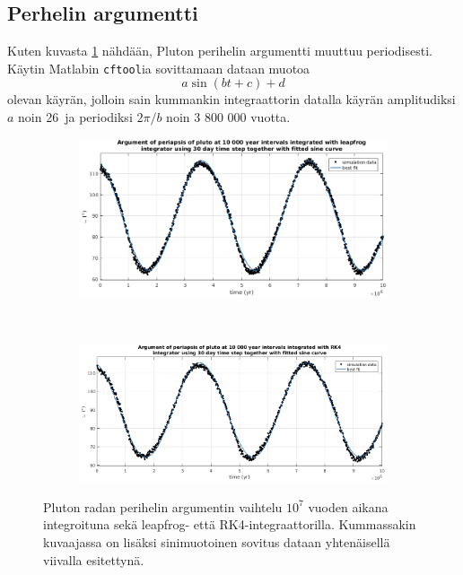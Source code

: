 \documentclass[12pt,a4paper,titlepage]{article}
\begin{document}
\subsection{Perhelin argumentti}
Kuten kuvasta \ref{longrun-omegas} nähdään, Pluton perihelin argumentti muuttuu periodisesti. Käytin Matlabin \texttt{cftool}ia sovittamaan dataan muotoa
$$a\sin{(bt+c)}+d$$
olevan käyrän, jolloin sain kummankin integraattorin datalla käyrän amplitudiksi $a$  noin 26\textdegree\ ja periodiksi $2\pi/b$ noin 3 800 000 vuotta.

\begin{figure}[h!]
    \centering
    \begin{subfigure}[b]{\textwidth}
        \includegraphics[width=\textwidth]{../plots/lf-longrun-omega-cut.png}
    \end{subfigure}
    \\
    \begin{subfigure}[b]{\textwidth}
        \includegraphics[width=\textwidth]{../plots/rk-longrun-omega-cut.png}
    \end{subfigure}
    \caption{Pluton radan perihelin argumentin vaihtelu $10^7$ vuoden aikana integroituna sekä leapfrog- että RK4-integraattorilla. Kummassakin kuvaajassa on lisäksi sinimuotoinen sovitus dataan yhtenäisellä viivalla esitettynä.}\label{longrun-omegas}
\end{figure}
\end{document}
